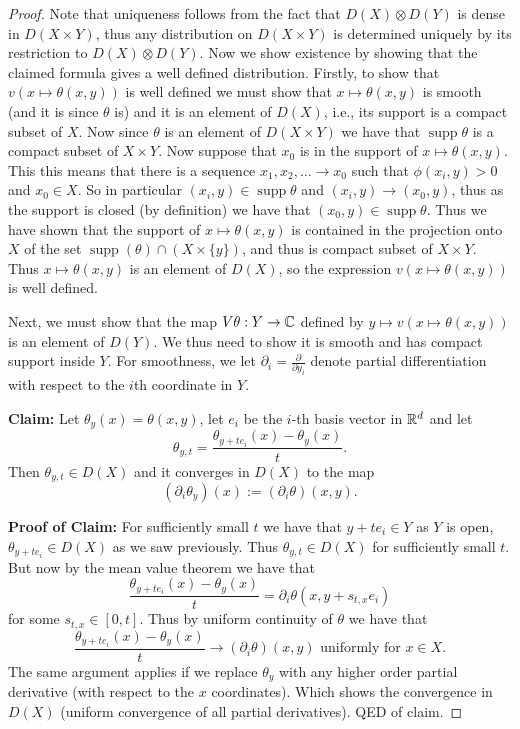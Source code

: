 \documentclass[twoside, a4paper, 10pt]{amsart}
\begin{document}
\begin{proof} Note that uniqueness follows from the fact that $D(X) \otimes D(Y)$ is dense in $D(X \times Y)$, thus any distribution on $D(X \times Y)$ is determined uniquely by its restriction to $D(X) \otimes D(Y)$. Now we show existence by showing that the claimed formula gives a well defined distribution. Firstly, to show that $v(x \mapsto \theta(x,y))$ is well defined we must show that $x \mapsto \theta(x,y)$ is smooth (and it is since $\theta$ is) and it is an element of $D(X)$, i.e., its support is a compact subset of $X$. Now since $\theta$ is an element of $D(X \times Y)$ we have that $\operatorname{supp} \theta$ is a compact subset of $X \times Y$. Now suppose that $x_0$ is in the support of $x \mapsto \theta(x,y)$. This this means that there is a sequence $x_1, x_2,\ldots \to x_0$ such that $\phi(x_i,y)>0$ and $x_0 \in X$. So in particular $(x_i,y) \in \operatorname{supp} \theta$ and $(x_i, y) \to (x_0,y)$, thus as the support is closed (by definition) we have that $(x_0,y) \in \operatorname{supp} \theta$. Thus we have shown that the support of $x \mapsto \theta(x,y)$ is contained in the projection onto $X$ of the set $\operatorname{supp}(\theta) \cap (X \times \{y\})$, and thus is compact subset of $X \times Y$. Thus $x \mapsto \theta(x,y)$ is an element of $D(X)$, so the expression $v(x \mapsto \theta(x,y))$ is well defined. 

Next, we must show that the map $V\theta:Y \to \mathbb{C}$ defined by $y \mapsto v(x \mapsto \theta(x,y))$ is an element of $D(Y)$. We thus need to show it is smooth and has compact support inside $Y$. For smoothness, we let $\partial_i = \frac{\partial}{\partial y_i}$ denote partial differentiation with respect to the $i$th coordinate in $Y$. 

\textbf{Claim:} Let $\theta_y(x) = \theta(x,y)$, let $e_i$ be the $i$-th basis vector in $\mathbb{R}^d$ and let $$\theta_{y,t} = \frac{\theta_{y+te_i}(x) - \theta_{y}(x)}{t}.$$ Then $\theta_{y,t} \in D(X)$ and it converges in $D(X)$ to the map $$(\partial_i \theta_y)(x) := (\partial_i\theta) (x,y).$$

\textbf{Proof of Claim:} For sufficiently small $t$ we have that $y+te_i \in Y$ as $Y$ is open, $\theta_{y+te_i} \in D(X)$ as we saw previously. Thus $\theta_{y,t} \in D(X)$ for sufficiently small $t$. But now by the mean value theorem we have that $$\frac{\theta_{y+te_i}(x) - \theta_y(x)}{t} = \partial_i \theta(x, y+s_{t,x}e_i)$$ for some $s_{t,x} \in [0,t]$. Thus by uniform continuity of $\theta$ we have that $$\frac{\theta_{y+te_i}(x) - \theta_y(x)}{t} \to (\partial_i \theta)(x,y) \text{ uniformly for }x \in X .$$ The same argument applies if we replace $\theta_{y}$ with any higher order partial derivative (with respect to the $x$ coordinates). Which shows the convergence in $D(X)$ (uniform convergence of all partial derivatives). QED of claim.


\end{proof}
\end{document}
